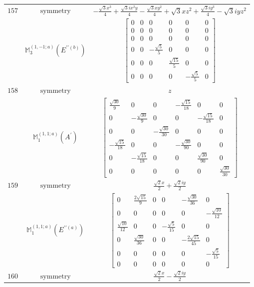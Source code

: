 \documentclass[fleqn,8pt,landscape]{jsarticle}
\begin{document}
\begin{longtable}{ccc}
$ 157 $ & $ \text{symmetry} $ & $ - \frac{\sqrt{3} x^{3}}{4} + \frac{\sqrt{3} i x^{2} y}{4} - \frac{\sqrt{3} x y^{2}}{4} + \sqrt{3} x z^{2} + \frac{\sqrt{3} i y^{3}}{4} - \sqrt{3} i y z^{2} $ \\
$  $ & $ \mathbb{M}_{3}^{(1,-1;a)}(E^{\prime\prime(b)}) $ & $ \begin{bmatrix} 0 & 0 & 0 & 0 & 0 & 0 \\ 0 & 0 & 0 & 0 & 0 & 0 \\ 0 & 0 & 0 & 0 & 0 & 0 \\ 0 & 0 & - \frac{\sqrt{5}}{5} & 0 & 0 & 0 \\ 0 & 0 & 0 & \frac{\sqrt{15}}{5} & 0 & 0 \\ 0 & 0 & 0 & 0 & - \frac{\sqrt{5}}{5} & 0 \end{bmatrix} $ \\ \hline
$ 158 $ & $ \text{symmetry} $ & $ z $ \\
$  $ & $ \mathbb{M}_{1}^{(1,1;a)}(A^{\prime}) $ & $ \begin{bmatrix} \frac{\sqrt{30}}{9} & 0 & 0 & - \frac{\sqrt{15}}{18} & 0 & 0 \\ 0 & - \frac{\sqrt{30}}{9} & 0 & 0 & - \frac{\sqrt{15}}{18} & 0 \\ 0 & 0 & - \frac{\sqrt{30}}{30} & 0 & 0 & 0 \\ - \frac{\sqrt{15}}{18} & 0 & 0 & - \frac{\sqrt{30}}{90} & 0 & 0 \\ 0 & - \frac{\sqrt{15}}{18} & 0 & 0 & \frac{\sqrt{30}}{90} & 0 \\ 0 & 0 & 0 & 0 & 0 & \frac{\sqrt{30}}{30} \end{bmatrix} $ \\ \hline
$ 159 $ & $ \text{symmetry} $ & $ \frac{\sqrt{2} x}{2} + \frac{\sqrt{2} i y}{2} $ \\
$  $ & $ \mathbb{M}_{1}^{(1,1;a)}(E^{\prime\prime(a)}) $ & $ \begin{bmatrix} 0 & \frac{2 \sqrt{15}}{9} & 0 & 0 & - \frac{\sqrt{30}}{36} & 0 \\ 0 & 0 & 0 & 0 & 0 & - \frac{\sqrt{10}}{12} \\ \frac{\sqrt{10}}{12} & 0 & 0 & - \frac{\sqrt{5}}{15} & 0 & 0 \\ 0 & \frac{\sqrt{30}}{36} & 0 & 0 & - \frac{2 \sqrt{15}}{45} & 0 \\ 0 & 0 & 0 & 0 & 0 & - \frac{\sqrt{5}}{15} \\ 0 & 0 & 0 & 0 & 0 & 0 \end{bmatrix} $ \\ \hline
$ 160 $ & $ \text{symmetry} $ & $ \frac{\sqrt{2} x}{2} - \frac{\sqrt{2} i y}{2} $ \\

\end{longtable}
\end{document}
